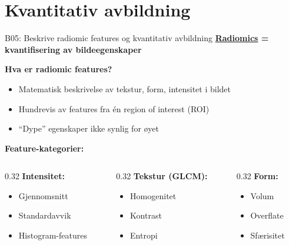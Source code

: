 \documentclass[aspectratio=169, 10pt]{beamer}
\begin{document}
\section{Kvantitativ avbildning}

\begin{frame}{B05: Beskrive radiomic features og kvantitativ avbildning}
    \textbf{\href{https://pyradiomics.readthedocs.io/}{Radiomics} = kvantifisering av bildeegenskaper}
    
    \vspace{0.3cm}
    \textbf{Hva er radiomic features?}
    \begin{itemize}
        \item Matematisk beskrivelse av tekstur, form, intensitet i bildet
        \item Hundrevis av features fra én region of interest (ROI)
        \item ``Dype'' egenskaper ikke synlig for øyet
    \end{itemize}
    
    \vspace{0.3cm}
    \textbf{Feature-kategorier:}
    \begin{columns}[T]
        \begin{column}{0.32\textwidth}
            \textbf{Intensitet:}
            \begin{itemize}
                \item Gjennomsnitt
                \item Standardavvik
                \item Histogram-features
            \end{itemize}
        \end{column}
        \begin{column}{0.32\textwidth}
            \textbf{Tekstur (GLCM):}
            \begin{itemize}
                \item Homogenitet
                \item Kontrast
                \item Entropi
            \end{itemize}
        \end{column}
        \begin{column}{0.32\textwidth}
            \textbf{Form:}
            \begin{itemize}
                \item Volum
                \item Overflate
                \item Sfærisitet
            \end{itemize}
        \end{column}
    \end{columns}
    

\end{frame}
\end{document}
